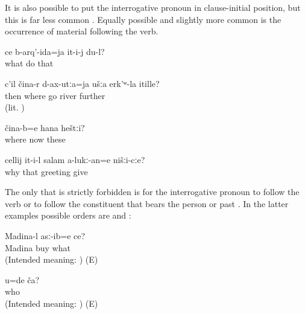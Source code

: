 It is also possible to put the interrogative pronoun in clause-initial position, but this is far less common . Equally possible and slightly more common is the occurrence of material following the verb.
%
\begin{exe}
	\ex	\label{ex:‎[He does not leave me alone], what should I do with him}
	\gll	ce	b-arq'-ida=ja	it-i-j	du-l?\\
		what	do	that	\\
	\glt	{}

	\ex	\label{ex:‎‎‎Then from where do you cross the river}
	\gll	c'il	čina-r	d-ax-utːa=ja	ušːa	erk'ʷ-la itille?\\
		then	where	go		river	further\\
	\glt	{} (lit. )

	\ex	\label{ex:‎Where are these now? (these = people)}
	\gll	čina-b=e	hana	heštːi?\\
		where	now	these	\\
	\glt	{}

	\ex	\label{ex:Why will he not greet us}
	\gll	cellij	it-i-l	salam	a-lukː-an=e	nišːi-cːe?\\
		why	that	greeting	give		\\
	\glt	{}
\end{exe}

The only  that is strictly forbidden is for the interrogative pronoun to follow the verb  or to follow the constituent that bears the person  or past  . In the latter examples possible orders are  and :
%
\begin{exe}
	\ex	\label{ex:What did Madina buy ungrammatical}
	\gll	* Madina-l	asː-ib=e ce?\\
		{} Madina	buy	what\\
	\glt	(Intended meaning: ) (E)

	\ex	\label{ex:Who are you ungrammatical}
	\gll	* u=de ča?\\
		{} 	who\\
	\glt	(Intended meaning: ) (E)
\end{exe}

